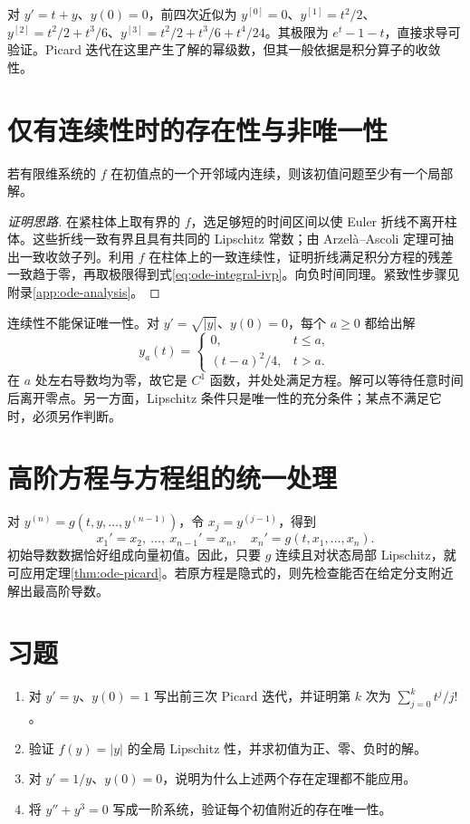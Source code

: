 \documentclass[UTF8,12pt,a4paper,fontset=fandol]{ctexbook}
\begin{document}
\begin{example}
对 $y'=t+y$、$y(0)=0$，前四次近似为 $y^{[0]}=0$、$y^{[1]}=t^2/2$、$y^{[2]}=t^2/2+t^3/6$、$y^{[3]}=t^2/2+t^3/6+t^4/24$。其极限为 $e^t-1-t$，直接求导可验证。Picard 迭代在这里产生了解的幂级数，但其一般依据是积分算子的收敛性。
\end{example}

\section{仅有连续性时的存在性与非唯一性}
\begin{theorem}
若有限维系统的 $f$ 在初值点的一个开邻域内连续，则该初值问题至少有一个局部解。
\end{theorem}
\begin{proof}[证明思路]
在紧柱体上取有界的 $f$，选足够短的时间区间以使 Euler 折线不离开柱体。这些折线一致有界且具有共同的 Lipschitz 常数；由 Arzelà--Ascoli 定理可抽出一致收敛子列。利用 $f$ 在柱体上的一致连续性，证明折线满足积分方程的残差一致趋于零，再取极限得到式\eqref{eq:ode-integral-ivp}。向负时间同理。紧致性步骤见附录\ref{app:ode-analysis}。
\end{proof}

连续性不能保证唯一性。对 $y'=\sqrt{|y|}$、$y(0)=0$，每个 $a\geq0$ 都给出解
\[
 y_a(t)=\begin{cases}0,&t\leq a,\\(t-a)^2/4,&t>a.\end{cases}
\]
在 $a$ 处左右导数均为零，故它是 $C^1$ 函数，并处处满足方程。解可以等待任意时间后离开零点。另一方面，Lipschitz 条件只是唯一性的充分条件；某点不满足它时，必须另作判断。

\section{高阶方程与方程组的统一处理}
对 $y^{(n)}=g(t,y,\ldots,y^{(n-1)})$，令 $x_j=y^{(j-1)}$，得到
\[
 x_1'=x_2,\ \ldots,\ x_{n-1}'=x_n,\quad x_n'=g(t,x_1,\ldots,x_n).
\]
初始导数数据恰好组成向量初值。因此，只要 $g$ 连续且对状态局部 Lipschitz，就可应用定理\ref{thm:ode-picard}。若原方程是隐式的，则先检查能否在给定分支附近解出最高阶导数。

\section{习题}
\begin{enumerate}
 \item\label{ex:ode-picard} 对 $y'=y$、$y(0)=1$ 写出前三次 Picard 迭代，并证明第 $k$ 次为 $\sum_{j=0}^k t^j/j!$。
 \item 验证 $f(y)=|y|$ 的全局 Lipschitz 性，并求初值为正、零、负时的解。
 \item 对 $y'=1/y$、$y(0)=0$，说明为什么上述两个存在定理都不能应用。
 \item 将 $y''+y^3=0$ 写成一阶系统，验证每个初值附近的存在唯一性。
\end{enumerate}
\end{document}
